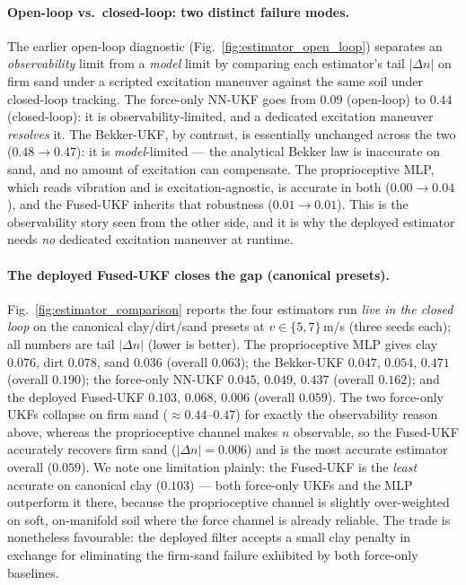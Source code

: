 \documentclass[conference,letterpaper,10pt]{IEEEtran}
\begin{document}
\paragraph{Open-loop vs.\ closed-loop: two distinct failure modes.}
The earlier open-loop diagnostic (Fig.~\ref{fig:estimator_open_loop})
separates an \emph{observability} limit from a \emph{model} limit by
comparing each estimator's tail $|\Delta n|$ on firm sand under a
scripted excitation maneuver against the same soil under closed-loop
tracking. The force-only NN-UKF goes from $0.09$ (open-loop) to $0.44$
(closed-loop): it is observability-limited, and a dedicated excitation
maneuver \emph{resolves} it. The Bekker-UKF, by contrast, is essentially
unchanged across the two ($0.48\!\to\!0.47$): it is \emph{model}-limited
--- the analytical Bekker law is inaccurate on sand, and no amount of
excitation can compensate. The
proprioceptive MLP, which reads vibration and is excitation-agnostic,
is accurate in both ($0.00\!\to\!0.04$), and the Fused-UKF inherits that
robustness ($0.01\!\to\!0.01$). This is the observability story seen
from the other side, and it is why the deployed estimator needs
\emph{no} dedicated excitation maneuver at runtime.

\paragraph{The deployed Fused-UKF closes the gap (canonical presets).}
Fig.~\ref{fig:estimator_comparison} reports the four estimators run
\emph{live in the closed loop} on the canonical clay/dirt/sand presets
at $v\!\in\!\{5,7\}\,$m/s (three seeds each); all numbers are tail
$|\Delta n|$ (lower is better). The proprioceptive MLP gives clay
$0.076$, dirt $0.078$, sand $0.036$ (overall $0.063$); the Bekker-UKF
$0.047$, $0.054$, $0.471$ (overall $0.190$); the force-only NN-UKF
$0.045$, $0.049$, $0.437$ (overall $0.162$); and the deployed Fused-UKF
$0.103$, $0.068$, $0.006$ (overall $0.059$). The two force-only UKFs
collapse on firm sand ($\approx\!0.44\text{--}0.47$) for exactly the
observability reason above, whereas the proprioceptive channel makes
$n$ observable, so the Fused-UKF accurately recovers firm sand
($|\Delta n|\!=\!0.006$) and is the most accurate estimator overall
($0.059$). We note one limitation plainly: the Fused-UKF is the
\emph{least} accurate on canonical clay ($0.103$) --- both force-only
UKFs and the MLP outperform it there, because the proprioceptive
channel is slightly over-weighted on soft, on-manifold soil where the
force channel is already reliable. The trade is nonetheless favourable:
the deployed filter accepts a small clay penalty in exchange for
eliminating the firm-sand failure exhibited by both force-only
baselines.
\end{document}
